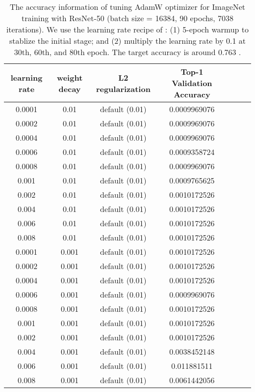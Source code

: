\documentclass{article} \usepackage{iclr2020_conference,times}
\begin{document}
\begin{table}[ht]
\renewcommand{\arraystretch}{1.3}
\caption{The accuracy information of tuning AdamW optimizer for ImageNet training with ResNet-50 (batch size = 16384, 90 epochs, 7038 iterations). We use the learning rate recipe of \citep{goyal2017accurate}: (1) 5-epoch warmup to stablize the initial stage; and (2) multiply the learning rate by 0.1 at 30th, 60th, and 80th epoch. The target accuracy is around 0.763 \citep{goyal2017accurate}.}
\centering
\begin{tabular}{|c|c|c|c|c|c|c|}
\hline
learning rate & weight decay & L2 regularization & Top-1 Validation Accuracy\\
\hline
\hline
0.0001 & 0.01 & default (0.01) & 0.0009969076\\
\hline
0.0002 & 0.01 & default (0.01) & 0.0009969076\\
\hline
0.0004 & 0.01 & default (0.01) & 0.0009969076\\
\hline
0.0006 & 0.01 & default (0.01) & 0.0009358724\\
\hline
0.0008 & 0.01 & default (0.01) & 0.0009969076\\
\hline
0.001 & 0.01 & default (0.01) & 0.0009765625\\
\hline
0.002 & 0.01 & default (0.01) & 0.0010172526\\
\hline
0.004 & 0.01 & default (0.01) & 0.0010172526\\
\hline
0.006 & 0.01 & default (0.01) & 0.0010172526\\
\hline
0.008 & 0.01 & default (0.01) & 0.0010172526\\
\hline
0.0001 & 0.001 & default (0.01) & 0.0010172526\\
\hline
0.0002 & 0.001 & default (0.01) & 0.0010172526\\
\hline
0.0004 & 0.001 & default (0.01) & 0.0010172526\\
\hline
0.0006 & 0.001 & default (0.01) & 0.0009969076\\
\hline
0.0008 & 0.001 & default (0.01) & 0.0010172526\\
\hline
0.001 & 0.001 & default (0.01) & 0.0010172526\\
\hline
0.002 & 0.001 & default (0.01) & 0.0010172526\\
\hline
0.004 & 0.001 & default (0.01) & 0.0038452148\\
\hline
0.006 & 0.001 & default (0.01) & 0.011881511\\
\hline
0.008 & 0.001 & default (0.01) & 0.0061442056\\
\hline
\end{tabular}
\label{table:imagenet_adam_tuning_l2_1}
\end{table}
\end{document}
